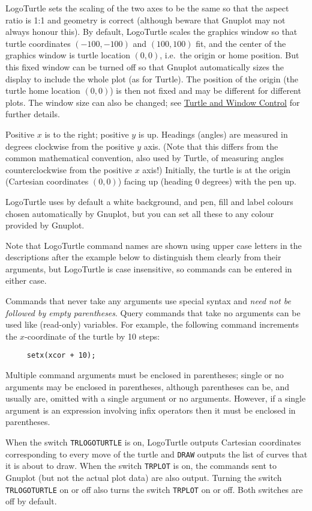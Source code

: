 LogoTurtle sets the scaling of the two axes to be the same so that the
aspect ratio is 1:1 and geometry is correct (although beware that
Gnuplot may not always honour this).  By default, LogoTurtle scales
the graphics window so that turtle coordinates $(-100,-100)$ and
$(100,100)$ fit, and the center of the graphics window is turtle
location $(0,0)$, i.e.\ the origin or home position.  But this fixed
window can be turned off so that Gnuplot automatically sizes the
display to include the whole plot (as for Turtle).  The position of
the origin (the turtle home location $(0,0)$) is then not fixed and
may be different for different plots.  The window size can also be
changed; see \hyperref[logoturtle:TWC]{Turtle and Window Control} for
further details.

Positive $x$ is to the right; positive $y$ is up.  Headings (angles)
are measured in degrees clockwise from the positive $y$ axis.  (Note
that this differs from the common mathematical convention, also used
by Turtle, of measuring angles counterclockwise from the positive $x$
axis!)  Initially, the turtle is at the origin (Cartesian coordinates
$(0,0)$) facing up (heading 0 degrees) with the pen up.

LogoTurtle uses by default a white background, and pen, fill and label
colours chosen automatically by Gnuplot, but you can set all these to
any colour provided by Gnuplot.

Note that LogoTurtle command names are shown using upper case letters
in the descriptions after the example below to distinguish them
clearly from their arguments, but LogoTurtle is case insensitive, so
commands can be entered in either case.

Commands that never take any arguments use special syntax and
\emph{need not be followed by empty parentheses}.  Query commands that
take no arguments can be used like (read-only) variables.  For
example, the following command increments the $x$-coordinate of the
turtle by 10 steps:
\begin{verbatim}
     setx(xcor + 10);
\end{verbatim}
Multiple command arguments must be enclosed in parentheses; single or
no arguments may be enclosed in parentheses, although parentheses can
be, and usually are, omitted with a single argument or no arguments.
However, if a single argument is an expression involving infix
operators then it must be enclosed in parentheses.

When the switch \texttt{TRLOGOTURTLE} is on, LogoTurtle outputs
Cartesian coordinates corresponding to every move of the turtle and
\texttt{DRAW} outputs the list of curves that it is about to draw.
When the switch \texttt{TRPLOT} is on, the commands sent to Gnuplot
(but not the actual plot data) are also output.  Turning the switch
\texttt{TRLOGOTURTLE} on or off also turns the switch \texttt{TRPLOT}
on or off.  Both switches are off by default.


